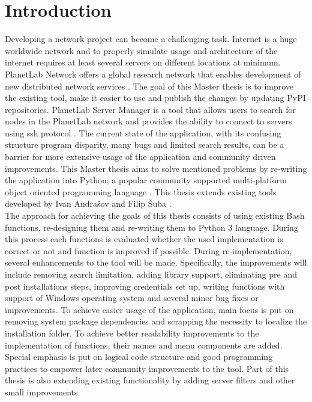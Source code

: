 \chapter*{Introduction}
{}

Developing a network project can become a challenging task. Internet is a huge worldwide network and to properly simulate usage and architecture of the internet requires at least several servers on different locations at minimum. PlanetLab Network offers a global research network that enables development of new distributed network services \cite{planetlababout}. The goal of this Master thesis is to improve the existing tool, make it easier to use and publish the changes by updating PyPI repositories. PlanetLab Server Manager is a tool that allows users to search for nodes in the PlanetLab network and provides the ability to connect to servers using ssh protocol \cite{andrasov2}. The current state of the application, with its confusing structure program disparity, many bugs and limited search results, can be a barrier for more extensive usage of the application and community driven improvements. This Master thesis aims to solve mentioned problems by re-writing the application into Python; a popular community supported multi-platform object oriented programming language \cite{lutz2013learning}. This thesis extends existing tools developed by Ivan Andrašov \cite{andrasov2} and Filip Šuba \cite{suba1}.\\
The approach for achieving the goals of this thesis consists of using existing Bash functions, re-designing them and re-writing them to Python 3 language. During this process each functions is evaluated whether the used implementation is correct or not and function is improved if possible. During re-implementation, several enhancements to the tool will be made. Specifically, the improvements will include removing search limitation, adding library support, eliminating pre and post installations steps, improving credentials set up, writing functions with support of Windows operating system and several minor bug fixes or improvements. To achieve easier usage of the application, main focus is put on removing system package dependencies and scrapping the necessity to localize the installation folder. To achieve better readability improvements to the implementation of functions, their names and menu components are added. Special emphasis is put on logical code structure and good programming practices to empower later community improvements to the tool. Part of this thesis is also extending existing functionality by adding server filters and other small improvements.\\
